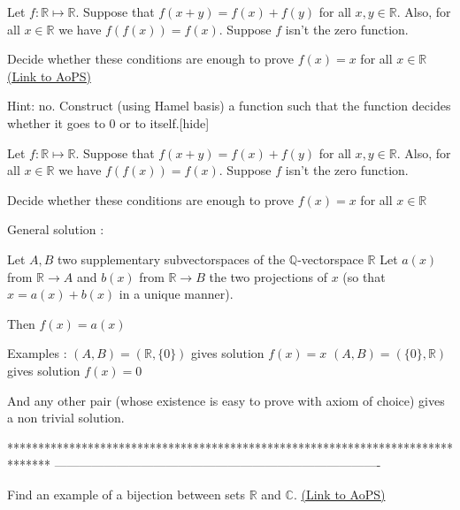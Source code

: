 \begin{problem}
	Let $f: \mathbb{R} \mapsto \mathbb{R}$. Suppose that $f(x+y)=f(x)+f(y)$ for all $x,y \in \mathbb{R}$. Also, for all $x \in \mathbb{R}$ we have $f(f(x))=f(x)$. Suppose $f$ isn't the zero function. 

Decide whether these conditions are enough to prove $f(x)=x$ for all $x \in \mathbb{R}$
	\flushright \href{https://artofproblemsolving.com/community/c6h595142}{(Link to AoPS)}
\end{problem}



\begin{solution}Hint: no. Construct (using Hamel basis) a function such that the function decides whether it goes to 0 or to itself.[\/hide]
\end{solution}



\begin{solution}
	\begin{tcolorbox}Let $f: \mathbb{R} \mapsto \mathbb{R}$. Suppose that $f(x+y)=f(x)+f(y)$ for all $x,y \in \mathbb{R}$. Also, for all $x \in \mathbb{R}$ we have $f(f(x))=f(x)$. Suppose $f$ isn't the zero function. 

Decide whether these conditions are enough to prove $f(x)=x$ for all $x \in \mathbb{R}$\end{tcolorbox}
General solution :

Let $A,B$ two supplementary subvectorspaces of the $\mathbb Q$-vectorspace $\mathbb R$
Let $a(x)$ from $\mathbb R\to A$ and $b(x)$ from $\mathbb R\to B$ the two projections of $x$ (so that $x=a(x)+b(x)$ in a unique manner).

Then $f(x)=a(x)$

Examples :
$(A,B)=(\mathbb R,\{0\})$ gives solution $f(x)=x$
$(A,B)=(\{0\},\mathbb R)$ gives solution $f(x)=0$

And any other pair (whose existence is easy to prove with axiom of choice) gives a non trivial solution.
\end{solution}
*******************************************************************************
-------------------------------------------------------------------------------

\begin{problem}
	Find an example of a bijection between sets $\mathbb{R}$ and $\mathbb{C}$.
	\flushright \href{https://artofproblemsolving.com/community/c6h595988}{(Link to AoPS)}
\end{problem}



